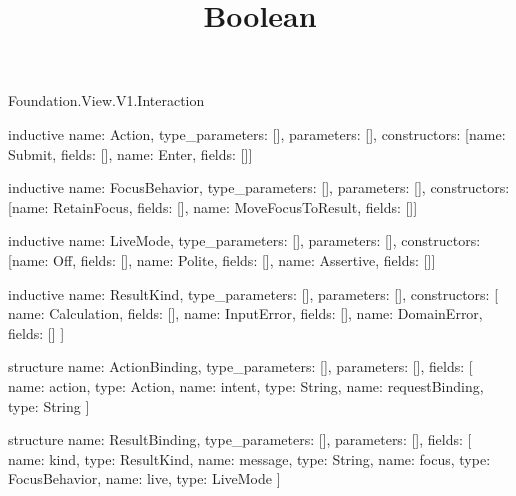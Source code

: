 \begin{lexlean}{Foundation.View.V1.Interaction}
\title{Boolean}
\begin{semanticmodule}
inductive{
  name: Action,
  type_parameters: [],
  parameters: [],
  constructors: [{name: Submit, fields: []}, {name: Enter, fields: []}]
}

inductive{
  name: FocusBehavior,
  type_parameters: [],
  parameters: [],
  constructors: [{name: RetainFocus, fields: []}, {name: MoveFocusToResult, fields: []}]
}

inductive{
  name: LiveMode,
  type_parameters: [],
  parameters: [],
  constructors: [{name: Off, fields: []}, {name: Polite, fields: []}, {name: Assertive, fields: []}]
}

inductive{
  name: ResultKind,
  type_parameters: [],
  parameters: [],
  constructors: [
    {name: Calculation, fields: []},
    {name: InputError, fields: []},
    {name: DomainError, fields: []}
  ]
}

structure{
  name: ActionBinding,
  type_parameters: [],
  parameters: [],
  fields: [
    {name: action, type: Action},
    {name: intent, type: String},
    {name: requestBinding, type: String}
  ]
}

structure{
  name: ResultBinding,
  type_parameters: [],
  parameters: [],
  fields: [
    {name: kind, type: ResultKind},
    {name: message, type: String},
    {name: focus, type: FocusBehavior},
    {name: live, type: LiveMode}
  ]
}
\end{semanticmodule}
\end{lexlean}
